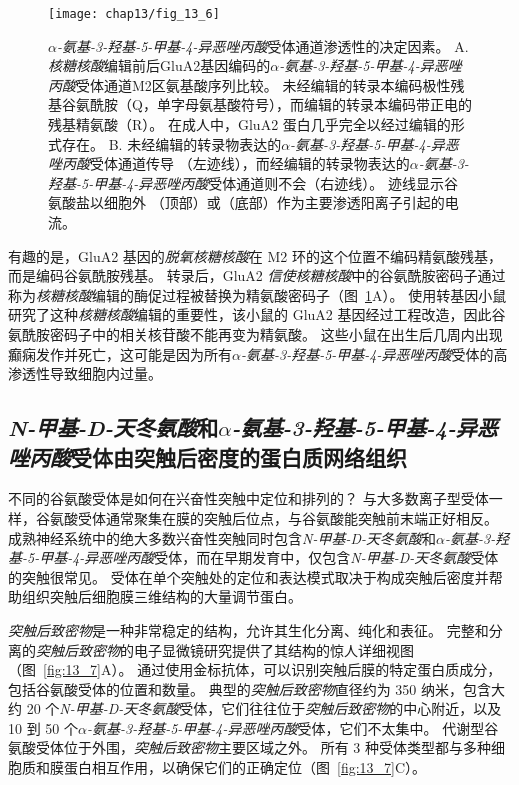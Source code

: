 \begin{figure}[htbp]
	\centering
	\texttt{[image: chap13/fig\_13\_6]}
	\caption{\textit{$\alpha$-氨基-3-羟基-5-甲基-4-异恶唑丙酸}受体通道渗透性的决定因素。
		A. \textit{核糖核酸}编辑前后GluA2基因编码的\textit{$\alpha$-氨基-3-羟基-5-甲基-4-异恶唑丙酸}受体通道M2区氨基酸序列比较。
		未经编辑的转录本编码极性残基谷氨酰胺（Q，单字母氨基酸符号），而编辑的转录本编码带正电的残基精氨酸（R）。
		在成人中，GluA2 蛋白几乎完全以经过编辑的形式存在。
		B. 未经编辑的转录物表达的\textit{$\alpha$-氨基-3-羟基-5-甲基-4-异恶唑丙酸}受体通道传导 （左迹线），而经编辑的转录物表达的\textit{$\alpha$-氨基-3-羟基-5-甲基-4-异恶唑丙酸}受体通道则不会（右迹线）。
		迹线显示谷氨酸盐以细胞外 （顶部）或（底部）作为主要渗透阳离子引起的电流\cite{sakmann1992nobel}。}
	\label{fig:13_6}
\end{figure}


有趣的是，GluA2 基因的\textit{脱氧核糖核酸}在 M2 环的这个位置不编码精氨酸残基，而是编码谷氨酰胺残基。
转录后，GluA2 \textit{信使核糖核酸}中的谷氨酰胺密码子通过称为\textit{核糖核酸}编辑的酶促过程被替换为精氨酸密码子（图~\ref{fig:13_6}A）。
使用转基因小鼠研究了这种\textit{核糖核酸}编辑的重要性，该小鼠的 GluA2 基因经过工程改造，因此谷氨酰胺密码子中的相关核苷酸不能再变为精氨酸。
这些小鼠在出生后几周内出现癫痫发作并死亡，这可能是因为所有\textit{$\alpha$-氨基-3-羟基-5-甲基-4-异恶唑丙酸}受体的高渗透性导致细胞内过量。



\subsection{\textit{N-甲基-D-天冬氨酸}和\textit{$\alpha$-氨基-3-羟基-5-甲基-4-异恶唑丙酸}受体由突触后密度的蛋白质网络组织}

不同的谷氨酸受体是如何在兴奋性突触中定位和排列的？ 
与大多数离子型受体一样，谷氨酸受体通常聚集在膜的突触后位点，与谷氨酸能突触前末端正好相反。
成熟神经系统中的绝大多数兴奋性突触同时包含\textit{N-甲基-D-天冬氨酸}和\textit{$\alpha$-氨基-3-羟基-5-甲基-4-异恶唑丙酸}受体，而在早期发育中，仅包含\textit{N-甲基-D-天冬氨酸}受体的突触很常见。
受体在单个突触处的定位和表达模式取决于构成突触后密度并帮助组织突触后细胞膜三维结构的大量调节蛋白。


\textit{突触后致密物}是一种非常稳定的结构，允许其生化分离、纯化和表征。
完整和分离的\textit{突触后致密物}的电子显微镜研究提供了其结构的惊人详细视图（图~\ref{fig:13_7}A）。 
通过使用金标抗体，可以识别突触后膜的特定蛋白质成分，包括谷氨酸受体的位置和数量。
典型的\textit{突触后致密物}直径约为 350 纳米，包含大约 20 个\textit{N-甲基-D-天冬氨酸}受体，它们往往位于\textit{突触后致密物}的中心附近，以及 10 到 50 个\textit{$\alpha$-氨基-3-羟基-5-甲基-4-异恶唑丙酸}受体，它们不太集中。
代谢型谷氨酸受体位于外围，\textit{突触后致密物}主要区域之外。
所有 3 种受体类型都与多种细胞质和膜蛋白相互作用，以确保它们的正确定位（图~\ref{fig:13_7}C）。


